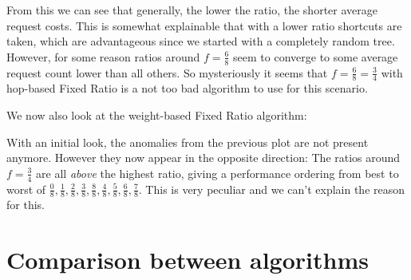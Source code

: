 \documentclass[a4paper, oneside]{discothesis}
\begin{document}
From this we can see that generally, the lower the ratio, the shorter average request costs. This is somewhat explainable that with a lower ratio shortcuts are taken, which are advantageous since we started with a completely random tree. However, for some reason ratios around $f=\frac{6}{8}$ seem to converge to some average request count lower than all others. So mysteriously it seems that $f=\frac{6}{8}=\frac{3}{4}$ with hop-based Fixed Ratio is a not too bad algorithm to use for this scenario. 

We now also look at the weight-based Fixed Ratio algorithm:


With an initial look, the anomalies from the previous plot are not present anymore. However they now appear in the opposite direction: The ratios around $f=\frac{3}{4}$ are all \textit{above} the highest ratio, giving a performance ordering from best to worst of $\frac{0}{8}, \frac{1}{8}, \frac{2}{8}, \frac{3}{8}, \frac{8}{8}, \frac{4}{8}, \frac{5}{8}, \frac{6}{8}, \frac{7}{8}$. This is very peculiar and we can't explain the reason for this.

\section{Comparison between algorithms}
\end{document}

